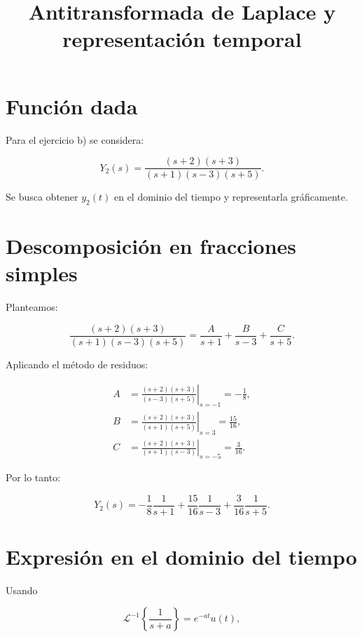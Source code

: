 \documentclass[12pt,a4paper]{article}
\title{Antitransformada de Laplace y representación temporal}
\author{}
\date{}
\begin{document}
\maketitle

\section*{Función dada}

Para el ejercicio b) se considera:

\begin{equation}
    Y_2(s)=\frac{(s+2)(s+3)}{(s+1)(s-3)(s+5)}.
\end{equation}

Se busca obtener $y_2(t)$ en el dominio del tiempo y representarla gráficamente.

\section*{Descomposición en fracciones simples}

Planteamos:

\begin{equation}
    \frac{(s+2)(s+3)}{(s+1)(s-3)(s+5)}
    =\frac{A}{s+1}+\frac{B}{s-3}+\frac{C}{s+5}.
\end{equation}

Aplicando el método de residuos:

\begin{align}
    A&=\left.\frac{(s+2)(s+3)}{(s-3)(s+5)}\right|_{s=-1}
      =-\frac{1}{8},\\
    B&=\left.\frac{(s+2)(s+3)}{(s+1)(s+5)}\right|_{s=3}
      =\frac{15}{16},\\
    C&=\left.\frac{(s+2)(s+3)}{(s+1)(s-3)}\right|_{s=-5}
      =\frac{3}{16}.
\end{align}

Por lo tanto:

\begin{equation}
    Y_2(s)=-\frac{1}{8}\frac{1}{s+1}
    +\frac{15}{16}\frac{1}{s-3}
    +\frac{3}{16}\frac{1}{s+5}.
\end{equation}

\section*{Expresión en el dominio del tiempo}

Usando

\begin{equation}
    \mathcal{L}^{-1}\left\{\frac{1}{s+a}\right\}=e^{-at}u(t),
\end{equation}
\end{document}
